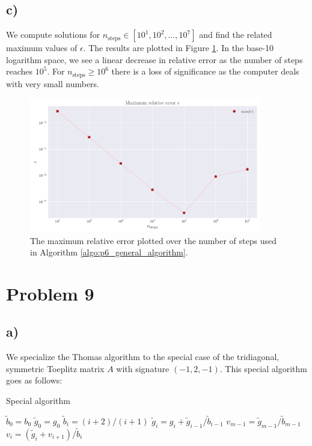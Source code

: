 \documentclass[english,notitlepage,nofootinbib]{revtex4-1}  %
\newcommand{\Fig}[1]{Figure \ref{fig:#1}}
\newcommand{\Algo}[1]{Algorithm \ref{algo:#1}}
\begin{document}
\subsection*{c)}
We compute solutions for $n_\text{steps}\in[10^1, 10^2, \dots, 10^7]$ and find the related maximum values of $\epsilon$. The results are plotted in \Fig{p8_max_rel_err}. In the base-10 logarithm space, we see a linear decrease in relative error as the number of steps reaches $10^5$. For $n_\text{steps}\geq 10^6$ there is a loss of significance as the computer deals with very small numbers.


\begin{figure}[h!]
    \centering
    \includegraphics[width=0.9\textwidth]{max_relative_error.pdf}
    \caption{The maximum relative error plotted over the number of steps used in \Algo{p6_general_algorithm}.}\label{fig:p8_max_rel_err}
\end{figure}

\section*{Problem 9}

\subsection*{a)}

We specialize the Thomas algorithm to the special case of the tridiagonal, symmetric Toeplitz matrix $A$ with signature $(-1,2,-1)$. This special algorithm goes as follows: 

\begin{algorithm}[H]
    \caption{Special algorithm}\label{algo:p9_special_algorithm}
    \begin{algorithmic}
        \State $\tilde{b}_0 = b_0$ 
        \State $\tilde{g}_0 = g_0$
        \State $\tilde{b}_i = (i+2)/(i+1)$ 
        \State $\tilde{g}_i = g_i + \tilde{g}_{i-1} / \tilde{b}_{i-1}$
        \EndFor
        \State $v_{m-1} = \tilde{g}_{m-1} / \tilde{b}_{m-1}$
        \State $v_i = (\tilde{g}_i + v_{i+1} ) / \tilde{b}_i$ 
        \EndFor
    \end{algorithmic}
\end{algorithm}
\end{document}
